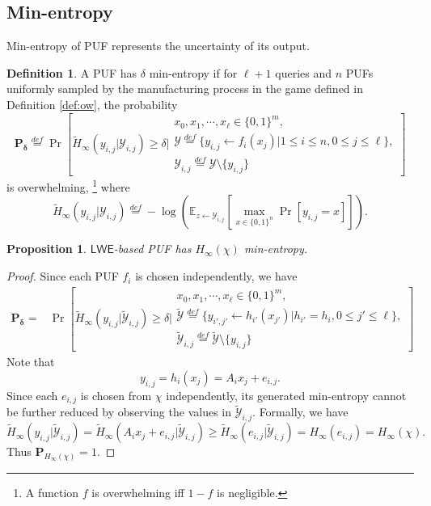 \documentclass[12pt]{article}
\newcommand{\eqdef}{\stackrel{def}{=}}
\newcommand{\bits}{\{0,1\}}
\newcommand{\Ex}{\mathbb{E}}
\newcommand{\LWE}{\mathsf{LWE}}
\newtheorem{proposition}[theorem]{Proposition}
\theoremstyle{definition}
\newtheorem{definition}[theorem]{Definition}
\begin{document}
\subsection{Min-entropy}
\label{sec:min-entrpy}
Min-entropy of PUF represents the uncertainty of its output.
\begin{definition}
A PUF has $\delta$ min-entropy if for $\ell+1$ queries and $n$ PUFs uniformly sampled by the manufacturing process in the game defined in Definition \ref{def:ow}, the probability
$$\mathbf{P_\delta} \eqdef
\Pr \left[\tilde{H}_{\infty}(y_{i,j} | \mathcal{Y}_{i,j})\geq \delta \bigg| 
\begin{array}{c}
x_0, x_1, \cdots, x_\ell \in \bits^m, \\
\mathcal{Y} \eqdef \{y_{i,j} \gets f_i(x_j) | 1\leq i \leq n, 0\leq j \leq \ell \}, \\
\mathcal{Y}_{i,j} \eqdef \mathcal{Y} \setminus \{y_{i,j}\}
\end{array}\right]$$
is overwhelming, \footnote{A function $f$ is overwhelming iff $1-f$ is negligible.} where 
$$\tilde{H}_{\infty}(y_{i,j} | \mathcal{Y}_{i,j}) \eqdef -\log \left( \Ex_{z \gets \mathcal{Y}_{i,j}} \left[\max_{x\in\bits^n}\Pr[y_{i,j} = x] \right]\right ).$$
\end{definition}

\begin{proposition}
$\LWE$-based PUF has $H_{\infty}(\chi)$ min-entropy.
\end{proposition}
\begin{proof}
Since each PUF $f_i$ is chosen independently, we have
$$\begin{aligned}
\mathbf{P_\delta} 
=& \Pr \left[\tilde{H}_{\infty}(y_{i,j} | \widetilde{\mathcal{Y}}_{i,j})\geq \delta \bigg| 
\begin{array}{c}
x_0, x_1, \cdots, x_\ell \in \bits^m, \\
\widetilde{\mathcal{Y}} \eqdef \{y_{i',j'} \gets h_{i'}(x_{j'}) | h_{i'} = h_i, 0\leq j' \leq \ell \}, \\
\widetilde{\mathcal{Y}}_{i,j} \eqdef \widetilde{\mathcal{Y}} \setminus \{y_{i,j}\}
\end{array}\right]
\end{aligned}$$
Note that 
$$y_{i,j} = h_i(x_j) = A_ix_j + e_{i,j}.$$
Since each $e_{i,j}$ is chosen from $\chi$ independently, its generated min-entropy cannot be further reduced by observing the values in $\widetilde{\mathcal{Y}}_{i,j}$. Formally, we have
$$\tilde{H}_{\infty}(y_{i,j} | \widetilde{\mathcal{Y}}_{i,j}) 
=\tilde{H}_{\infty}(A_ix_j + e_{i,j} | \widetilde{\mathcal{Y}}_{i,j}) 
\geq \tilde{H}_{\infty}(e_{i,j} | \widetilde{\mathcal{Y}}_{i,j}) 
= H_{\infty}(e_{i,j}) = H_{\infty}(\chi). $$
Thus $\mathbf{P}_{H_{\infty}(\chi)} = 1$.
\end{proof}
\end{document}
